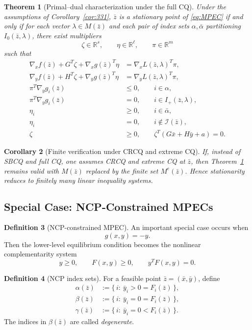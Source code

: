 \documentclass[pdflatex,sn-mathphys-num]{sn-jnl}%
\newtheorem{theorem}{Theorem}[section]
\newtheorem{corollary}[theorem]{Corollary}
\theoremstyle{definition}
\newtheorem{definition}[theorem]{Definition}
\newcommand{\R}{\mathbb{R}}
\newcommand{\Ical}{\mathcal{I}}
\begin{document}
\begin{theorem}[Primal--dual characterization under the full CQ]
\label{thm:334}
Under the assumptions of Corollary~\ref{cor:331}, $\bar z$ is a stationary
point of \eqref{eq:MPEC} if and only if for each vector
$\lambda\in M(\bar z)$ and each pair of index sets
$\alpha,\bar\alpha$ partitioning $I_0(\bar z,\lambda)$, there exist
multipliers
\[
\zeta\in\R^s,\qquad \eta\in\R^\ell,\qquad \pi\in\R^m
\]
such that
\begin{align*}
\nabla_x f(\bar z)+G^T\zeta+\nabla_x g(\bar z)^T\eta
&=
\nabla_x L(\bar z,\lambda)^T\pi,
\\
\nabla_y f(\bar z)+H^T\zeta+\nabla_y g(\bar z)^T\eta
&=
\nabla_y L(\bar z,\lambda)^T\pi,
\\
\pi^T\nabla_y g_i(\bar z) &\le 0,
\qquad i\in\alpha,
\\
\pi^T\nabla_y g_i(\bar z) &= 0,
\qquad i\in I_+(\bar z,\lambda),
\\
\eta_i &\ge 0,
\qquad i\in\bar\alpha,
\\
\eta_i &= 0,
\qquad i\notin \Ical(\bar z),
\\
\zeta &\ge 0,
\qquad
\zeta^T(G\bar x+H\bar y+a)=0.
\end{align*}
\end{theorem}

\begin{corollary}[Finite verification under CRCQ and extreme CQ]
If, instead of SBCQ and full CQ, one assumes CRCQ and extreme CQ at
$\bar z$, then Theorem~\ref{thm:334} remains valid with $M(\bar z)$
replaced by the finite set $M^e(\bar z)$. Hence stationarity reduces to
finitely many linear inequality systems.
\end{corollary}

\subsection{Special Case: NCP-Constrained MPECs}

\begin{definition}[NCP-constrained MPEC]
An important special case occurs when
\[
g(x,y)=-y.
\]
Then the lower-level equilibrium condition becomes the nonlinear
complementarity system
\[
y\ge 0,\qquad F(x,y)\ge 0,\qquad y^T F(x,y)=0.
\]
\end{definition}

\begin{definition}[NCP index sets]
For a feasible point $\bar z=(\bar x,\bar y)$, define
\begin{align*}
\alpha(\bar z)&:=\{\,i:\ \bar y_i>0=F_i(\bar z)\,\},\\
\beta(\bar z)&:=\{\,i:\ \bar y_i=0=F_i(\bar z)\,\},\\
\gamma(\bar z)&:=\{\,i:\ \bar y_i=0<F_i(\bar z)\,\}.
\end{align*}
The indices in $\beta(\bar z)$ are called \emph{degenerate}.
\end{definition}
\end{document}
